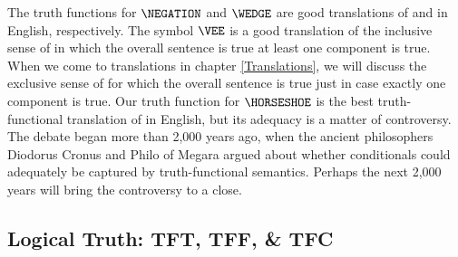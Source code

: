 The truth functions for $\NEGATION$ and $\WEDGE$ are good translations of  and  in English, respectively.  The symbol $\VEE$ is a good translation of the inclusive sense of  in which the overall sentence is true \Iff at least one component is true.  When we come to translations in chapter \ref{Translations}, we will discuss the exclusive sense of  for which the overall sentence is true just in case exactly one component is true. Our truth function for $\HORSESHOE$ is the best truth-functional translation of  in English, but its adequacy is a matter of controversy. The debate began more than 2,000 years ago, when the ancient philosophers Diodorus Cronus and Philo of Megara argued about whether conditionals could adequately be captured by truth-functional semantics. Perhaps the next 2,000 years will bring the controversy to a close.

\subsection{Logical Truth: TFT, TFF, \& TFC}\label{TFT TFF TFI}

